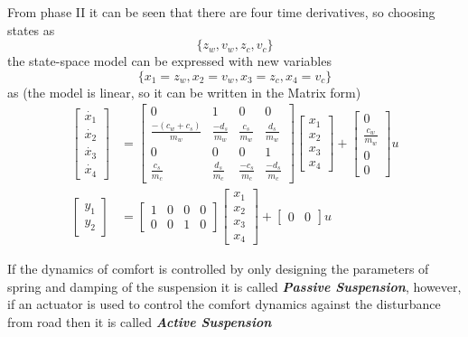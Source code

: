 From phase II it can be seen that there are four time derivatives, so choosing states as 
$$ \{ z_w, v_w, z_c, v_c \} $$ the state-space model can be expressed with new variables $$ \{ x_1 = z_w, x_2 = v_w, x_3 = z_c, x_4 = v_c  \} $$ as (the model is linear, so it can be written in the Matrix form)
\begin{align}
	\begin{bmatrix}
	\dot{x_1} \\\dot{x_2} \\ \dot{x_3} \\ \dot{x_4}
	\end{bmatrix} &= \begin{bmatrix}
		0 & 1 & 0 & 0 \\ 
		\frac{-(c_w + c_s)}{m_w} & \frac{-d_s}{m_w} & \frac{c_s}{m_w} & \frac{d_s}{m_w} \\
		0 & 0 & 0 & 1 \\
		\frac{c_s}{m_c} & \frac{d_s}{m_c} & \frac{-c_s}{m_c} & \frac{-d_s}{m_c}
	\end{bmatrix} \begin{bmatrix}
	x_1 \\ x_2 \\ x_3 \\ x_4
	\end{bmatrix} + \begin{bmatrix}
		0 \\ \frac{c_w}{m_w} \\ 0 \\ 0
	\end{bmatrix} u \\
	\begin{bmatrix}
		y_1 \\ y_2 \end{bmatrix} &= \begin{bmatrix}
			1 & 0 & 0 & 0 \\ 0 & 0 & 1 & 0
		\end{bmatrix}\begin{bmatrix}
		x_1 \\ x_2 \\ x_3 \\ x_4
		\end{bmatrix} + \begin{bmatrix}
			 0 & 0 
		\end{bmatrix} u	
\end{align}

If the dynamics of comfort is controlled by only designing the parameters of spring and damping of the suspension it is called \textbf{\textit{Passive Suspension}}, however, if an actuator is used to control the comfort dynamics against the disturbance from road then it is called \textbf{\textit{Active Suspension}}

